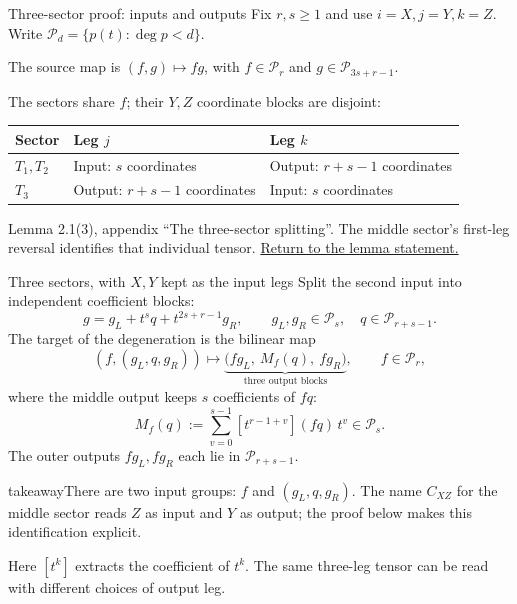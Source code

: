 \documentclass[aspectratio=169,11pt]{beamer}
\newcommand{\source}[1]{\vfill\par{\fontsize{7.5}{9}\selectfont\color{muted}#1\par}}
\newcommand{\takeaway}[1]{\begin{beamercolorbox}[sep=0.65em,wd=\linewidth]{takeaway}#1\end{beamercolorbox}}
\begin{document}
\begin{frame}[label=three-sector-proof]{Three-sector proof: inputs and outputs}
  Fix $r,s\ge1$ and use $i=X,j=Y,k=Z$.
  Write $\mathcal P_d=\{p(t):\deg p<d\}$.
  \par\smallskip
  The source map is $(f,g)\mapsto fg$, with
  $f\in\mathcal P_r$ and $g\in\mathcal P_{3s+r-1}$.
  \par\smallskip
  The sectors share $f$; their $Y,Z$ coordinate blocks are disjoint:
  \begin{center}
    \renewcommand{\arraystretch}{1.2}
    \begin{tabular}{@{}lll@{}}
      \toprule
      Sector & Leg $j$ & Leg $k$\\
      \midrule
      $T_1,T_2$ & Input: $s$ coordinates & Output: $r+s-1$ coordinates\\
      $T_3$ & Output: $r+s-1$ coordinates & Input: $s$ coordinates\\
      \bottomrule
    \end{tabular}
  \end{center}
  \source{Lemma 2.1(3), appendix ``The three-sector splitting''.
  The middle sector's first-leg reversal identifies that individual tensor.
  \hyperlink{three-sector-splitting}{Return to the lemma statement.}}
\end{frame}

\begin{frame}{Three sectors, with $X,Y$ kept as the input legs}
  Split the second input into independent coefficient blocks:
  \[
    g=g_L+t^s q+t^{2s+r-1}g_R,\qquad
    g_L,g_R\in\mathcal P_s,\quad q\in\mathcal P_{r+s-1}.
  \]
  The target of the degeneration is the bilinear map
  \[
    (f,(g_L,q,g_R))\longmapsto
      \underbrace{\bigl(fg_L,\ M_f(q),\ fg_R\bigr)}_{\text{three output blocks}},
      \qquad f\in\mathcal P_r,
  \]
  where the middle output keeps $s$ coefficients of $fq$:
  \[
    M_f(q):=\sum_{v=0}^{s-1}[t^{r-1+v}](fq)\,t^v
      \in\mathcal P_s.
  \]
  The outer outputs $fg_L,fg_R$ each lie in $\mathcal P_{r+s-1}$.
  \par\medskip
  \takeaway{There are two input groups: $f$ and $(g_L,q,g_R)$.
    The name $C_{XZ}$ for the middle sector reads $Z$ as input and $Y$
    as output; the proof below makes this identification explicit.}
  \source{Here $[t^k]$ extracts the coefficient of $t^k$.
  The same three-leg tensor can be read with different choices of output leg.}
\end{frame}
\end{document}
